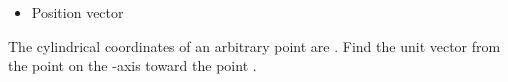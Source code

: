 \begin{ELunit}

\begin{itemize}
\tightlist
\item
  Position vector
\end{itemize}



\end{ELunit}


\begin{ELexample}{}

The cylindrical coordinates of an arbitrary point  are . Find the unit vector from the point  on the -axis toward the point .

\begin{ELsolution}



\end{ELsolution}

\end{ELexample}

